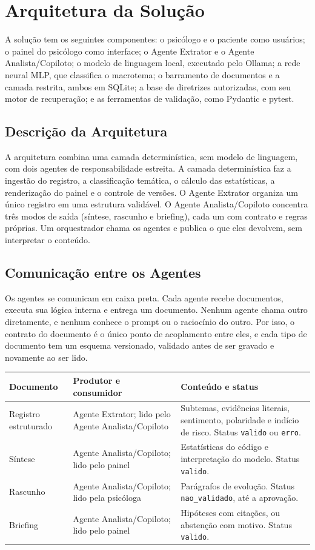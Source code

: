 \documentclass[12pt,a4paper]{article}
\newcommand{\cab}[1]{\textbf{#1}}
\begin{document}
\section{Arquitetura da Solução}

A solução tem os seguintes componentes: o psicólogo e o paciente como usuários; o painel do
psicólogo como interface; o Agente Extrator e o Agente Analista/Copiloto; o modelo de linguagem
local, executado pelo Ollama; a rede neural MLP, que classifica o macrotema; o barramento de
documentos e a camada restrita, ambos em SQLite; a base de diretrizes autorizadas, com seu motor
de recuperação; e as ferramentas de validação, como Pydantic e pytest.

\subsection{Descrição da Arquitetura}
A arquitetura combina uma camada determinística, sem modelo de linguagem, com dois agentes de
responsabilidade estreita. A camada determinística faz a ingestão do registro, a classificação
temática, o cálculo das estatísticas, a renderização do painel e o controle de versões. O Agente
Extrator organiza um único registro em uma estrutura validável. O Agente Analista/Copiloto
concentra três modos de saída (síntese, rascunho e briefing), cada um com contrato e regras
próprias. Um orquestrador chama os agentes e publica o que eles devolvem, sem interpretar o
conteúdo.

\subsection{Comunicação entre os Agentes}
Os agentes se comunicam em caixa preta. Cada agente recebe documentos, executa sua lógica
interna e entrega um documento. Nenhum agente chama outro diretamente, e nenhum conhece o
prompt ou o raciocínio do outro. Por isso, o contrato do documento é o único ponto de acoplamento
entre eles, e cada tipo de documento tem um esquema versionado, validado antes de ser gravado e
novamente ao ser lido.

\begin{tabularx}{\textwidth}{|p{4cm}|p{3.5cm}|Y|}
  \hline
  \cab{Documento} & \cab{Produtor e consumidor} & \cab{Conteúdo e status} \\ \hline
  Registro estruturado & Agente Extrator; lido pelo Agente Analista/Copiloto & Subtemas, evidências literais, sentimento, polaridade e indício de risco. Status \texttt{valido} ou \texttt{erro}. \\ \hline
  Síntese & Agente Analista/Copiloto; lido pelo painel & Estatísticas do código e interpretação do modelo. Status \texttt{valido}. \\ \hline
  Rascunho & Agente Analista/Copiloto; lido pela psicóloga & Parágrafos de evolução. Status \texttt{nao\_validado}, até a aprovação. \\ \hline
  Briefing & Agente Analista/Copiloto; lido pelo painel & Hipóteses com citações, ou abstenção com motivo. Status \texttt{valido}. \\ \hline
\end{tabularx}
\end{document}
